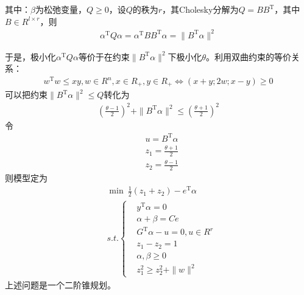         其中：$\beta$为松弛变量，$Q \geqslant 0$，设$Q$的秩为$r$，其Cholesky分解为$Q=BB^\mathrm{T} $，其中$B\in R^{l\times r}$，则
        \begin{align*}
          {\alpha}^\mathrm{T} Q{\alpha}={\alpha}^\mathrm{T} BB^\mathrm{T} {\alpha}=\|B^\mathrm{T} \alpha\|^2
        \end{align*}
        \par
        于是，极小化${\alpha}^\mathrm{T} Q{\alpha}$等价于在约束$\|B^\mathrm{T} \alpha\|^2$下极小化$\theta$。利用双曲约束的等价关系：
        \begin{align*}
        w^\mathrm{T}w \leqslant xy , w\in R^n ,x\in R_+,y\in R_+ \Leftrightarrow (x+y;2w;x-y) \geqslant 0
        \end{align*}
        可以把约束$\|B^\mathrm{T} \alpha\|^2 \leqslant Q$转化为
        \begin{align*}
          \left( \frac {\theta-1}{2} \right) ^2+\|B^\mathrm{T} \alpha\|^2 \leqslant \left( \frac {\theta+1}{2} \right) ^2
        \end{align*}
        令
        \begin{align*}
          & u=B^\mathrm{T} \alpha\\
          & z_1=\frac {\theta +1}{2}\\
          & z_2=\frac {\theta -1}{2}
        \end{align*}
        则模型定为
        \begin{align*}
          & \mathop{\min}\  \frac 12 (z_1+z_2)-e^\mathrm{T} {\alpha}\\
          & s.t.\left\{
            \begin{aligned}
          & y^\mathrm{T} {\alpha}=0\\
          & {\alpha}+\beta = Ce\\
          & G^\mathrm{T} {\alpha}-u=0,u \in R^r\\
          & z_1-z_2=1\\
          & {\alpha},\beta \geqslant 0\\
          & z_1^2\geqslant z_2^2+\|w\|^2
            \end{aligned}
             \right.
        \end{align*}
        上述问题是一个二阶锥规划。
